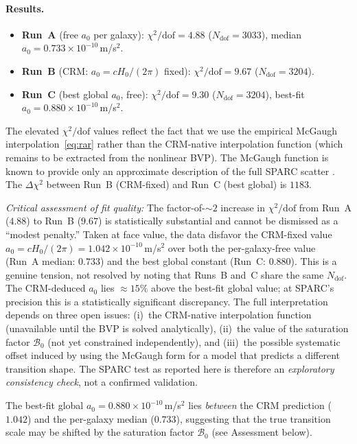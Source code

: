 \documentclass[aps,prd,twocolumn,superscriptaddress,nofootinbib]{revtex4-2}
\begin{document}
\paragraph{Results.}
\begin{itemize}
\item \textbf{Run~A} (free $a_0$ per galaxy): $\chi^2/\mathrm{dof} = 4.88$ ($N_{\mathrm{dof}} = 3033$), median $a_0 = 0.733 \times 10^{-10}$\,m/s$^2$.
\item \textbf{Run~B} (CRM: $a_0 = cH_0/(2\pi)$ fixed): $\chi^2/\mathrm{dof} = 9.67$ ($N_{\mathrm{dof}} = 3204$).
\item \textbf{Run~C} (best global $a_0$, free): $\chi^2/\mathrm{dof} = 9.30$ ($N_{\mathrm{dof}} = 3204$), best-fit $a_0 = 0.880 \times 10^{-10}$\,m/s$^2$.
\end{itemize}

The elevated $\chi^2/\mathrm{dof}$ values reflect the fact that we use the empirical McGaugh interpolation~\eqref{eq:rar} rather than the CRM-native interpolation function (which remains to be extracted from the nonlinear BVP). The McGaugh function is known to provide only an approximate description of the full SPARC scatter \cite{Li2018}. The $\Delta\chi^2$ between Run~B (CRM-fixed) and Run~C (best global) is $1183$.

\textit{Critical assessment of fit quality:} The factor-of-$\sim 2$ increase in $\chi^2/\mathrm{dof}$ from Run~A ($4.88$) to Run~B ($9.67$) is statistically substantial and cannot be dismissed as a ``modest penalty.'' Taken at face value, the data disfavor the CRM-fixed value $a_0 = cH_0/(2\pi) = 1.042 \times 10^{-10}$\,m/s$^2$ over both the per-galaxy-free value (Run~A median: $0.733$) and the best global constant (Run~C: $0.880$). This is a genuine tension, not resolved by noting that Runs~B and~C share the same $N_\mathrm{dof}$. The CRM-deduced $a_0$ lies $\approx 15\%$ above the best-fit global value; at SPARC's precision this is a statistically significant discrepancy. The full interpretation depends on three open issues: (i)~the CRM-native interpolation function (unavailable until the BVP is solved analytically), (ii)~the value of the saturation factor $\mathcal{B}_0$ (not yet constrained independently), and (iii)~the possible systematic offset induced by using the McGaugh form for a model that predicts a different transition shape. The SPARC test as reported here is therefore an \emph{exploratory consistency check}, not a confirmed validation.

The best-fit global $a_0 = 0.880 \times 10^{-10}$\,m/s$^2$ lies \textit{between} the CRM prediction ($1.042$) and the per-galaxy median ($0.733$), suggesting that the true transition scale may be shifted by the saturation factor $\mathcal{B}_0$ (see Assessment below).
\end{document}
